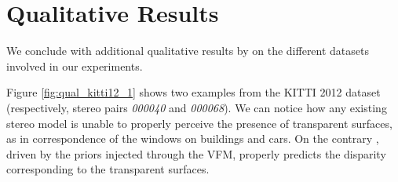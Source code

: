 \clearpage

\section{Qualitative Results}
\label{subsec:qual}

We conclude with additional qualitative results by \method on the different datasets involved in our experiments.

Figure \ref{fig:qual_kitti12_1} shows two examples from the KITTI 2012 dataset (respectively, stereo pairs \textit{000040} and \textit{000068}). We can notice how any existing stereo model is unable to properly perceive the presence of transparent surfaces, as in correspondence of the windows on buildings and cars. On the contrary \method{}, driven by the priors injected through the VFM, properly predicts the disparity corresponding to the transparent surfaces.   

